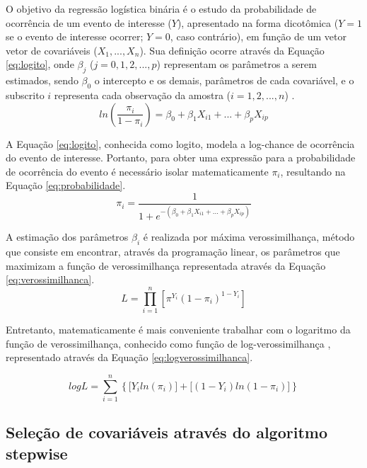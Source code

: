 \documentclass[twocolumn]{rbef}
\newcommand{\1}{\mathbbm{1}}
\begin{document}
O objetivo da regressão logística binária é o estudo da probabilidade de ocorrência de um evento de interesse (\(Y\)), apresentado na forma dicotômica (\(Y=1\) se o evento de interesse ocorrer; \(Y=0\), caso contrário), em função de um vetor vetor de covariáveis (\(X_1, ..., X_n\)). Sua definição ocorre através da Equação \eqref{eq:logito}, onde \(\beta_j\) (\(j = 0,1,2,...,p\)) representam os parâmetros a serem estimados, sendo \(\beta_0\) o intercepto e os demais, parâmetros de cada covariável, e o subscrito \(i\) representa cada observação da amostra (\(i = 1, 2,...,n\)) \cite{Favero2017}.
\begin{equation}
ln \left ( \dfrac{\pi_i}{1-\pi_i} \right ) = \beta_0 + \beta_1 X_{i1} + ... +  \beta_p X_{ip}\label{eq:logito}
\end{equation}

A Equação \eqref{eq:logito}, conhecida como logito, modela a log-chance de ocorrência do evento de interesse. Portanto, para obter uma expressão para a probabilidade de ocorrência do evento é necessário isolar matematicamente \(\pi_i\), resultando na Equação \eqref{eq:probabilidade}.
\begin{equation}
\pi_i = \dfrac{1}{1 + e^{-(\beta_0 + \beta_1 X_{i1} + ... +  \beta_p X_{ip})}}\label{eq:probabilidade}
\end{equation}

A estimação dos parâmetros \(\beta_i\) é realizada por máxima verossimilhança, método que consiste em encontrar, através da programação linear, os parâmetros que maximizam a função de verossimilhança representada através da Equação \eqref{eq:verossimilhanca}.
\begin{equation}
L =  \prod_{i=1}^{n} \left[ \pi^{Y_i} (1-\pi_i)^{1-Y_i} \right]\label{eq:verossimilhanca}
\end{equation}

Entretanto, matematicamente é mais conveniente trabalhar com o logaritmo da função de verossimilhança, conhecido como função de log-verossimilhança \cite{Favero2017,Botelho2010}, representado através da Equação \eqref{eq:logverossimilhanca}.

\begin{equation}
logL = \sum_{i=1}^{n} \left\{ \big[Y_iln(\pi_i)\big] + \big[(1-Y_i)ln(1-\pi_i)\big] \right\}\label{eq:logverossimilhanca}
\end{equation}

\hypertarget{seleuxe7uxe3o-de-covariuxe1veis-atravuxe9s-do-algoritmo-stepwise}{%
\subsection{Seleção de covariáveis através do algoritmo stepwise}\label{seleuxe7uxe3o-de-covariuxe1veis-atravuxe9s-do-algoritmo-stepwise}}
\end{document}
